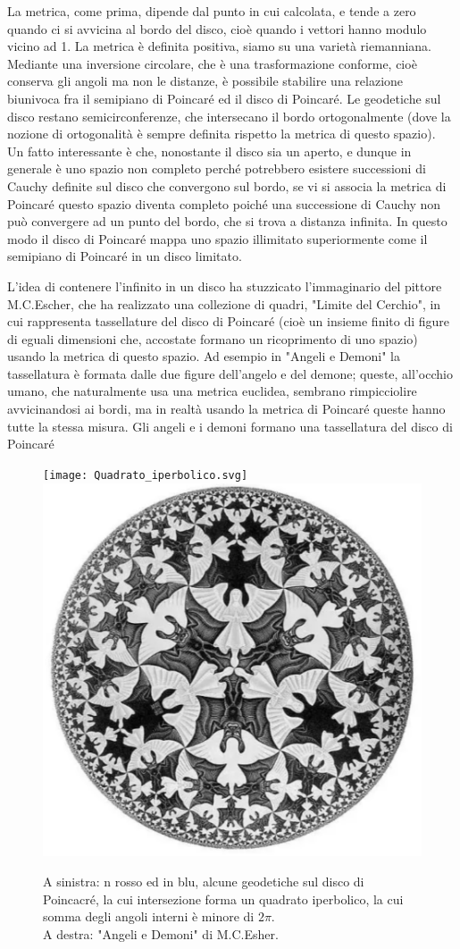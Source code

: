 \documentclass[
10pt, %
a4paper, %
oneside, %
headinclude,footinclude, %
BCOR5mm, %
]{scrartcl}
\begin{document}
La metrica, come prima, dipende dal punto in cui calcolata, e tende a zero quando ci si avvicina al bordo del disco, cioè quando i vettori hanno modulo vicino ad 1. La metrica è definita positiva, siamo su una varietà riemanniana. Mediante una inversione circolare, che è una trasformazione conforme, cioè conserva gli angoli ma non le distanze, è possibile stabilire una relazione biunivoca fra il semipiano di Poincaré ed il disco di Poincaré. Le geodetiche sul disco restano semicirconferenze, che intersecano il bordo ortogonalmente (dove la nozione di ortogonalità è sempre definita rispetto la metrica di questo spazio).\\
Un fatto interessante è che, nonostante il disco sia un aperto, e dunque in generale è uno spazio non completo perché potrebbero esistere successioni di Cauchy definite sul disco che convergono sul bordo, se vi si associa la metrica di Poincaré questo spazio diventa completo poiché una successione di Cauchy non può convergere ad un punto del bordo, che si trova a distanza infinita. In questo modo il disco di Poincaré mappa uno spazio illimitato superiormente come il semipiano di Poincaré in un disco limitato. 
\begin{osservazione}
	L'idea di contenere l'infinito in un disco ha stuzzicato l'immaginario del pittore M.C.Escher, che ha realizzato una collezione di quadri, "Limite del Cerchio", in cui rappresenta tassellature del disco di Poincaré (cioè un insieme finito di figure di eguali dimensioni che, accostate formano un ricoprimento di uno spazio) usando la metrica di questo spazio. Ad esempio in "Angeli e Demoni" la tassellatura è formata dalle due figure dell'angelo e del demone; queste, all'occhio umano, che naturalmente usa una metrica euclidea, sembrano rimpicciolire avvicinandosi ai bordi, ma in realtà usando la metrica di Poincaré queste hanno tutte la stessa misura. Gli angeli e i demoni formano una tassellatura del disco di Poincaré
	\begin{figure}[h!]
		\centering
		\texttt{[image: Quadrato\_iperbolico.svg]}	\quad
		\includegraphics[width=0.4\linewidth]{angeli-demoni}
		\caption{A sinistra: n rosso ed in blu, alcune geodetiche sul disco di Poincacré, la cui intersezione forma un quadrato iperbolico, la cui somma degli angoli interni è minore di \(2\pi\).\\
			A destra: "Angeli e Demoni" di M.C.Esher.}
		\label{fig:quadratoiperbolico}
	\end{figure}
\FloatBarrier
\end{osservazione}
\newpage
\end{document}
